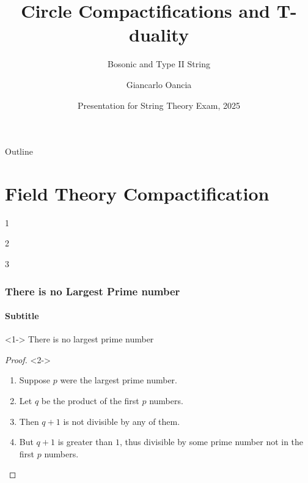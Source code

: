 \documentclass{beamer}
\title %
{Circle Compactifications and T-duality}
\subtitle
{Bosonic and Type II String}
\author %
{Giancarlo Oancia}
\institute[University of Bologna] %
{
  Department of Theoretical Physics\\
  University of Bologna}
\date[String Theory, 2025] %
{Presentation for String Theory Exam, 2025}
\begin{document}
\begin{frame}
	\titlepage
\end{frame}

\begin{frame}{Outline}
	\tableofcontents
\end{frame}





\section{Field Theory Compactification}
\begin{frame}
  1
  
  \hyperlink{foo}{}
  
  \end{frame}
  
  \begin{frame}
  2
  \end{frame}
  
  \begin{frame}[label=foo]
  3
  \end{frame}


\begin{frame}[t]
	\frametitle{There is no Largest Prime number}
	\framesubtitle{Subtitle}

	\begin{theorem}<1->
		There is no largest prime number
	\end{theorem}
	\begin{proof}<2->
		\begin{enumerate}
			\item<2-> Suppose $p$ were the largest prime number.
			\item<3-> Let $q$ be the product of the first $p$ numbers.
			\item<4-> Then $q + 1$ is not divisible by any of them.
			\item<2-> But $q + 1$ is greater than $1$, thus divisible by some prime
			      number not in the first $p$ numbers.\qedhere
		\end{enumerate}
	\end{proof}

\end{frame}
\end{document}
